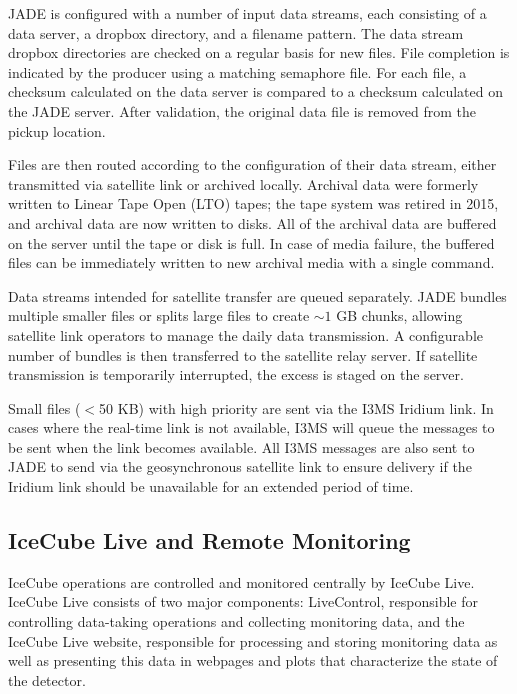 JADE is configured with a number of input data streams, 
each consisting of a data server, a dropbox directory, and a filename pattern.  The
data stream dropbox directories are checked on a regular basis for new
files.  File completion is indicated by the producer using a matching
semaphore file.  For each file, a
checksum calculated on the data server is compared to a checksum calculated
on the JADE server.  After validation, the original data file is removed
from the pickup location. 

Files are then routed according to the configuration of their
data stream, either transmitted via satellite link or 
archived locally.  Archival data
were formerly written to Linear Tape Open (LTO) tapes; the tape system was
retired in 2015, and archival data are now written to disks.
All of the archival data are buffered on the server until the tape or disk
is full. In case of media failure, the buffered files can be 
immediately written to new archival media with a single command.

Data streams intended for satellite transfer are queued separately.  
JADE bundles multiple smaller files or splits large files to create $\sim1$
GB chunks, allowing satellite link operators to manage the daily data
transmission.  A configurable number of bundles is then transferred to the
satellite relay server.  If satellite transmission is temporarily
interrupted, the excess is staged on the server. 

Small files ($<$50 KB) with high priority are sent via
the I3MS Iridium link.  In cases where the real-time link is not available, I3MS
will queue the messages to be sent when the link becomes available. All
I3MS messages are also sent to JADE to send via the geosynchronous satellite link to
ensure delivery if the Iridium link should be unavailable for an extended
period of time.

\subsection{\label{sec:online:icecubelive}IceCube Live and Remote Monitoring}

IceCube operations are controlled and monitored centrally by IceCube Live.
IceCube Live consists of two major components: LiveControl,
responsible for controlling data-taking operations and collecting
monitoring data, and the IceCube Live website, responsible for processing
and storing monitoring data as well as presenting this data in webpages and
plots that characterize the state of the detector.

